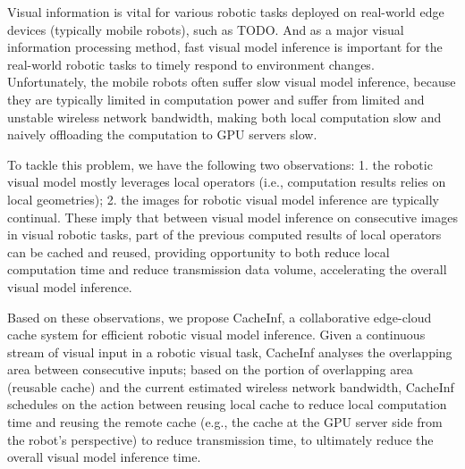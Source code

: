 Visual information is vital for various robotic tasks deployed on real-world edge devices (typically mobile robots), such as TODO. 
And as a major visual information processing method, fast visual model inference is important for the real-world robotic tasks to timely respond to environment changes. 
Unfortunately, the mobile robots often suffer slow visual model inference, because they are typically limited in computation power and suffer from limited and unstable wireless network bandwidth, making both local computation slow and naively offloading the computation to GPU servers slow.


To tackle this problem, we have the following two observations:
1. the robotic visual model mostly leverages local operators (i.e., computation results relies on local geometries); 
2. the images for robotic visual model inference are typically continual.
These imply that between visual model inference on consecutive images in visual robotic tasks, part of the previous computed results of local operators can be cached and reused, providing opportunity to both reduce local computation time and reduce transmission data volume, accelerating the overall visual model inference.


Based on these observations, we propose CacheInf, a collaborative edge-cloud cache system for efficient robotic visual model inference.
Given a continuous stream of visual input in a robotic visual task, CacheInf analyses the overlapping area between consecutive inputs;
based on the portion of overlapping area (reusable cache) and the current estimated wireless network bandwidth, CacheInf schedules on the action between reusing local cache to reduce local computation time and reusing the remote cache (e.g., the cache at the GPU server side from the robot's perspective) to reduce transmission time, to ultimately reduce the overall visual model inference time.

